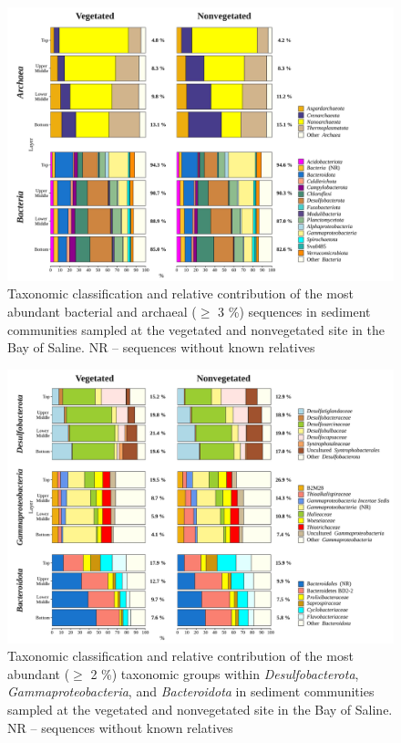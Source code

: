 \documentclass[12pt,]{article}
\begin{document}
\begin{figure}[H]

{\centering \includegraphics[width=1\linewidth]{../results/figures/community_barplot} 

}

\caption{Taxonomic classification and relative contribution of the most abundant  bacterial and archaeal ($\geq$ 3 \si{\percent}) sequences in sediment communities sampled at the vegetated and nonvegetated site in the Bay of Saline. NR -- sequences without known relatives\label{community_barplot}}\label{fig:unnamed-chunk-5}
\end{figure}

\begin{figure}[H]

{\centering \includegraphics[width=1\linewidth]{../results/figures/community_barplot_major_1} 

}

\caption{Taxonomic classification and relative contribution of the most abundant ($\geq$ 2 \si{\percent}) taxonomic groups within \textit{Desulfobacterota}, \textit{Gammaproteobacteria}, and \textit{Bacteroidota} in sediment communities sampled at the vegetated and nonvegetated site in the Bay of Saline. NR -- sequences without known relatives\label{community_barplot_major1}}\label{fig:unnamed-chunk-6}
\end{figure}
\end{document}
